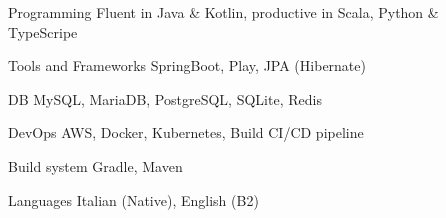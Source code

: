 
\begin{cvskills}
  \cvskill
    {Programming} %
    {Fluent in Java \& Kotlin, productive in Scala, Python \& TypeScripe} %

  \cvskill
    {Tools and Frameworks} %
    {SpringBoot, Play, JPA (Hibernate)} %

  \cvskill
    {DB} %
    {MySQL, MariaDB, PostgreSQL, SQLite, Redis} %
    
  \cvskill
    {DevOps} %
    {AWS, Docker, Kubernetes, Build CI/CD pipeline} %

  \cvskill
    {Build system} %
    {Gradle, Maven} %

  \cvskill
    {Languages} %
    {Italian (Native), English (B2)} %

\end{cvskills}
